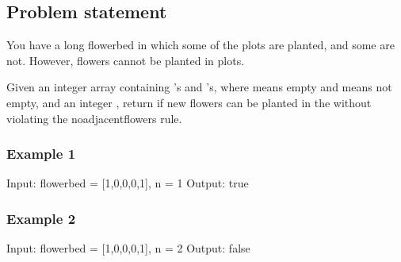 \documentclass[letterpaper,12pt,english]{book}
\begin{document}
\subsection{Problem statement\sphinxfootnotemark[10]}
\label{\detokenize{Array/01_ARR_605_Can_Place_Flowers:problem-statement}}%
\begin{footnotetext}[10]\sphinxAtStartFootnote
{}
%
\end{footnotetext}\ignorespaces 
\sphinxAtStartPar
You have a long flowerbed in which some of the plots are planted, and some are not. However, flowers cannot be planted in  plots.

\sphinxAtStartPar
Given an integer array  containing ’s and ’s, where  means empty and  means not empty, and an integer , return  if  new flowers can be planted in the  without violating the no\sphinxhyphen{}adjacent\sphinxhyphen{}flowers rule.


\subsubsection{Example 1}
\label{\detokenize{Array/01_ARR_605_Can_Place_Flowers:example-1}}
\begin{sphinxVerbatim}[commandchars=\\\{\}]
Input: flowerbed = [1,0,0,0,1], n = 1
Output: true
\end{sphinxVerbatim}


\subsubsection{Example 2}
\label{\detokenize{Array/01_ARR_605_Can_Place_Flowers:example-2}}
\begin{sphinxVerbatim}[commandchars=\\\{\}]
Input: flowerbed = [1,0,0,0,1], n = 2
Output: false
\end{sphinxVerbatim}
\end{document}
